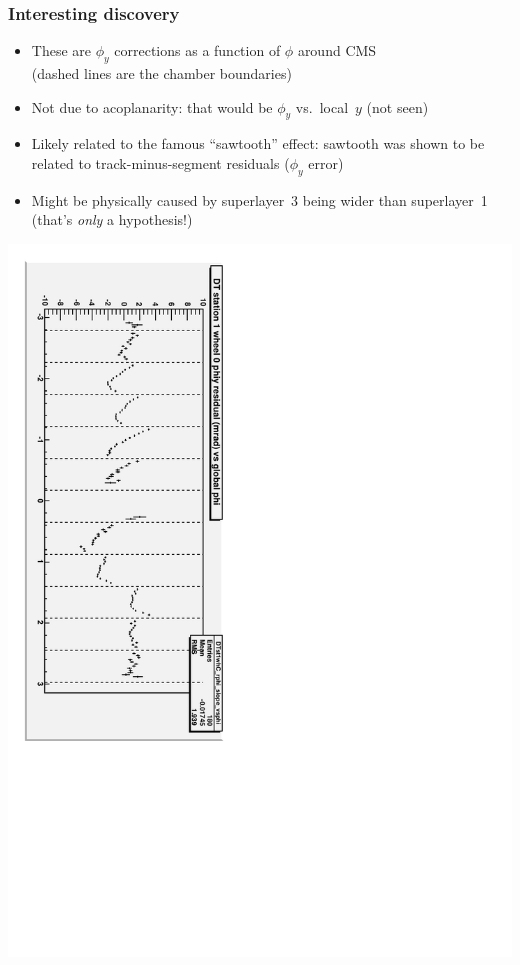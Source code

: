 \documentclass[compress]{beamer}
\begin{document}
\begin{frame}
\frametitle{Interesting discovery}

\begin{itemize}
\item These are $\phi_y$ corrections as a function of $\phi$ around CMS \\ (dashed lines are the chamber boundaries)
\item Not due to acoplanarity: that would be $\phi_y$ vs.~local~$y$ (not seen)
\item Likely related to the famous ``sawtooth'' effect: sawtooth was shown to be related to track-minus-segment residuals ($\phi_y$ error)
\item Might be physically caused by superlayer~3 being wider than superlayer~1 (that's {\it only} a hypothesis!)
\end{itemize}

\includegraphics[height=\linewidth, angle=90]{possible_acoplanarity.pdf}
\end{frame}
\end{document}
